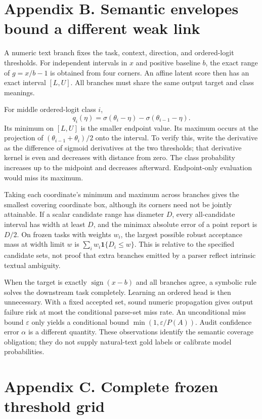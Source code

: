\documentclass[11pt]{article}
\begin{document}
\section*{Appendix B. Semantic envelopes bound a different weak link}

A numeric text branch fixes the task, context, direction, and ordered-logit thresholds. For independent intervals in $x$ and positive baseline $b$, the exact range of $g=x/b-1$ is obtained from four corners. An affine latent score then has an exact interval $[L,U]$. All branches must share the same output target and class meanings.

For middle ordered-logit class $i$,
\[
q_i(\eta)=\sigma(\theta_i-\eta)-\sigma(\theta_{i-1}-\eta).
\]
Its minimum on $[L,U]$ is the smaller endpoint value. Its maximum occurs at the projection of $(\theta_{i-1}+\theta_i)/2$ onto the interval. To verify this, write the derivative as the difference of sigmoid derivatives at the two thresholds; that derivative kernel is even and decreases with distance from zero. The class probability increases up to the midpoint and decreases afterward. Endpoint-only evaluation would miss its maximum.

Taking each coordinate's minimum and maximum across branches gives the smallest covering coordinate box, although its corners need not be jointly attainable. If a scalar candidate range has diameter $D$, every all-candidate interval has width at least $D$, and the minimax absolute error of a point report is $D/2$. On frozen tasks with weights $w_i$, the largest possible robust acceptance mass at width limit $w$ is $\sum_iw_i\mathbf1\{D_i\le w\}$. This is relative to the specified candidate sets, not proof that extra branches emitted by a parser reflect intrinsic textual ambiguity.

When the target is exactly $\operatorname{sign}(x-b)$ and all branches agree, a symbolic rule solves the downstream task completely. Learning an ordered head is then unnecessary. With a fixed accepted set, sound numeric propagation gives output failure risk at most the conditional parse-set miss rate. An unconditional miss bound $\varepsilon$ only yields a conditional bound $\min(1,\varepsilon/P(A))$. Audit confidence error $\alpha$ is a different quantity. These observations identify the semantic coverage obligation; they do not supply natural-text gold labels or calibrate model probabilities.

\section*{Appendix C. Complete frozen threshold grid}
\end{document}
